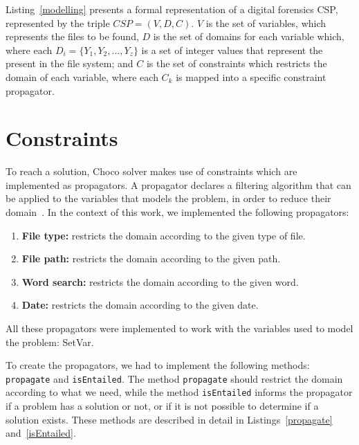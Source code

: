 Listing~\ref{modelling} presents a formal representation of a digital forensics \ac{CSP}, represented by the triple $CSP = (V,D,C)$. $V$ is the set of variables, which represents the files to be found, $D$ is the set of domains for each variable which, where each $D_i = \{Y_1,Y_2,\ldots,Y_z\}$ is a set of integer values that represent the \INODES present in the file system; and $C$ is the set of constraints which restricts the domain of each variable, where each $C_k$ is mapped into a specific constraint propagator.

\section{Constraints}
\label{Constraints}

To reach a solution, Choco solver makes use of constraints which are implemented as propagators. A propagator declares a filtering algorithm that can be applied to the variables that models the problem, in order to reduce their domain~\cite{Propagator}. In the context of this work, we implemented the following propagators:

\begin{enumerate}
    \item \textbf{File type:} restricts the domain according to the given type of file.
    \item \textbf{File path:} restricts the domain according to the given path.
    \item \textbf{Word search:} restricts the domain according to the given word.
    \item \textbf{Date:} restricts the domain according to the given date.
\end{enumerate}

All these propagators were implemented to work with the variables used to model the problem: SetVar.

To create the propagators, we had to implement the following methods: \texttt{propagate} and \texttt{isEntailed}. The method \texttt{propagate} should restrict the domain according to what we need, while the method \texttt{isEntailed} informs the propagator if a problem has a solution or not, or if it is not possible to determine if a solution exists. These methods are described in detail in Listings~\ref{propagate} and~\ref{isEntailed}.


